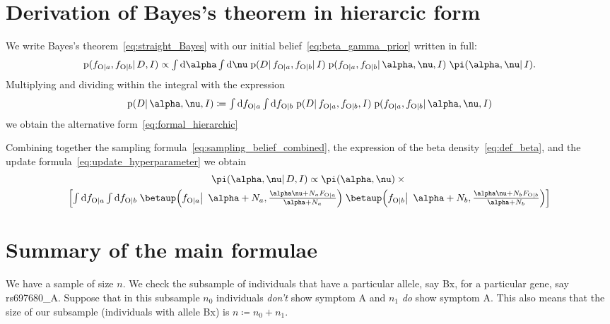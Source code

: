 \documentclass[\ifafour a4paper,12pt,\else a5paper,10pt,\fi%
onecolumn,oneside,article,%
british%
]{memoir}
\theoremstyle{remark}
\theoremstyle{innote}
\newcommand*{\di}{\mathrm{d}}%
\newcommand*{\defd}{\coloneqq}
\newcommand*{\pf}{\mathrm{p}}%
\renewcommand*{\|}{\mathpunct{|}}
\newcommand*{\bigcond}{\mathpunct{\big|\ }}%
\newcommand*{\tint}{\begingroup\textstyle\int\endgroup\nolimits}
\newcommand*{\yD}{D}
\newcommand*{\yI}{I}
\newcommand*{\ya}{a}
\newcommand*{\yb}{b}
\newcommand*{\ysA}{\textrm{O}}%
\newcommand*{\dbeta}{\betaup}
\newcommand*{\dA}{\pi}
\newcommand*{\yA}{\alpha}
\newcommand*{\yq}{\nu}
\begin{document}
\section{Derivation of Bayes's theorem in hierarcic form}
\label{sec:bayes_hierarcic}

We write Bayes's theorem~\eqref{eq:straight_Bayes} with our initial
belief~\eqref{eq:beta_gamma_prior} written in full:
\begin{equation}
  \label{eq:straight_Bayes_full_prior}
  \pf(f_{\ysA\|\ya}, f_{\ysA\|\yb} \| \yD, \yI)
  \propto
  \tint\di\yA\tint\di\yq\;
    \pf(\yD \| f_{\ysA\|\ya}, f_{\ysA\|\yb} \| \yI)\;
 \pf(f_{\ysA\|\ya}, f_{\ysA\|\yb} \|\yA,\yq, \yI)\;
  \dA(\yA,\yq \|\yI).
\end{equation}
Multiplying and dividing within the integral with the expression
\begin{equation}
  \label{eq:def_Aq_given_data}
    \pf(\yD \|\yA,\yq,\yI)\defd
\tint\di f_{\ysA\|\ya}\tint\di f_{\ysA\|\yb}\;
  \pf(\yD \|f_{\ysA\|\ya}, f_{\ysA\|\yb}, \yI)\;
  \pf(f_{\ysA\|\ya}, f_{\ysA\|\yb}\| \yA,\yq,\yI)
\end{equation}
we obtain the alternative form~\eqref{eq:formal_hierarchic}



Combining together the sampling
formula~\eqref{eq:sampling_belief_combined}, the expression of the beta
density~\eqref{eq:def_beta}, and the update
formula~\eqref{eq:update_hyperparameter} we obtain
\begin{multline}
  \label{eq:parameter_posterior_first}
  \dA(\yA,\yq \|\yD, \yI) \propto
    \dA(\yA,\yq) \times{}\\
  \Bigl[   \tint\di f_{\ysA\|\ya}\tint\di f_{\ysA\|\yb}\;
  \dbeta\Bigl(f_{\ysA\|\ya} \bigcond \yA+N_{\ya},
  \frac{\yA\yq+N_{\ya}F_{\ysA\|\ya}}{\yA+N_{\ya}}
    \Bigl)\;
  \dbeta\Bigl(f_{\ysA\|\yb} \bigcond \yA+N_{\yb},
  \frac{\yA\yq+N_{\yb}F_{\ysA\|\yb}}{\yA+N_{\yb}}
    \Bigr)
       \Bigr]
\end{multline}


\section{Summary of the main formulae}

We have a sample of size $n$. We check the subsample of individuals that
have a particular allele, say Bx, for a particular gene, say rs697680\_A.
Suppose that in this subsample $n_0$ individuals \emph{don't} show symptom
A and $n_1$ \emph{do} show symptom A. This also means that the size of our
subsample (individuals with allele Bx) is $n \defd n_0+n_1$.
\end{document}
